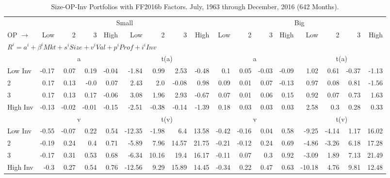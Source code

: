 
\begin{table}[!ht]
\centering
\caption{Size-OP-Inv Portfolios with FF2016b Factors. \footnotesize{July, 1963 through December, 2016 (642 Months).}}
\begin{tabular}{lrrrrrrrrrrrrrrrr}
  \toprule
    & \multicolumn{8}{c}{Small} & \multicolumn{8}{c}{Big} \\
      \cmidrule(r){2-9} \cmidrule(r){10-17}
    OP $\rightarrow$ & Low & 2 & 3 & High & Low & 2 & 3 & High & Low & 2 & 3 & High & Low & 2 & 3 & High \\ 
  \midrule
  \multicolumn{17}{l}{$R^i=a^i+\beta^iMkt+s^iSize+v^iVal+p^iProf+i^iInv$} \\

  
    
      & \multicolumn{4}{c}{a} & \multicolumn{4}{c}{t(a)}
    
      & \multicolumn{4}{c}{a} & \multicolumn{4}{c}{t(a)}
    
    \\
      \cmidrule(r){2-5} \cmidrule(r){6-9} \cmidrule(r){10-13} \cmidrule(r){14-17}

    Low Inv   & -0.17  & 0.07  & 0.19  & -0.04  & -1.84  & 0.99  & 2.53  & -0.48  & 0.1  & 0.05  & -0.03  & -0.09  & 1.02  & 0.61  & -0.37  & -1.13  \\
           2  & 0.17  & 0.13  & -0.0  & 0.07  & 2.43  & 2.0  & -0.08  & 0.98  & 0.09  & 0.01  & 0.07  & -0.13  & 0.97  & 0.08  & 0.81  & -1.56  \\
           3  & 0.17  & 0.13  & 0.17  & -0.06  & 3.08  & 1.96  & 2.93  & -0.67  & 0.07  & 0.01  & 0.06  & 0.15  & 0.92  & 0.07  & 0.73  & 1.63  \\
    High Inv  & -0.13  & -0.02  & -0.01  & -0.15  & -2.51  & -0.38  & -0.14  & -1.39  & 0.18  & 0.03  & 0.03  & 0.03  & 2.58  & 0.3  & 0.28  & 0.33  \\

  
    
      & \multicolumn{4}{c}{v} & \multicolumn{4}{c}{t(v)}
    
      & \multicolumn{4}{c}{v} & \multicolumn{4}{c}{t(v)}
    
    \\
      \cmidrule(r){2-5} \cmidrule(r){6-9} \cmidrule(r){10-13} \cmidrule(r){14-17}

    Low Inv   & -0.55  & -0.07  & 0.22  & 0.54  & -12.35  & -1.98  & 6.4  & 13.58  & -0.42  & -0.16  & 0.04  & 0.58  & -9.25  & -4.14  & 1.17  & 16.02  \\
           2  & -0.19  & 0.24  & 0.4  & 0.71  & -5.89  & 7.96  & 14.57  & 21.75  & -0.21  & -0.12  & 0.24  & 0.69  & -4.86  & -3.26  & 6.18  & 17.28  \\
           3  & -0.17  & 0.31  & 0.53  & 0.68  & -6.34  & 10.16  & 19.4  & 16.17  & -0.11  & 0.07  & 0.3  & 0.92  & -3.09  & 1.89  & 7.13  & 21.49  \\
    High Inv  & -0.3  & 0.27  & 0.54  & 0.76  & -12.56  & 9.29  & 15.89  & 14.45  & -0.34  & 0.22  & 0.47  & 0.63  & -10.18  & 4.76  & 9.81  & 12.48  \\


\end{tabular}
\end{table}
